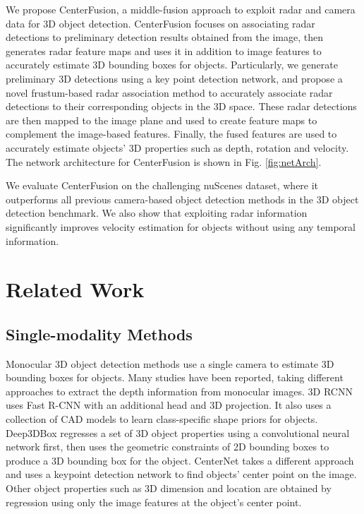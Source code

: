 \documentclass[10pt,twocolumn,letterpaper]{article}
\newcommand\method{CenterFusion}
\begin{document}
   
   We propose \method{}, a middle-fusion approach to exploit 
   radar and camera data for 3D object detection. \method{} focuses
   on associating radar detections to preliminary detection results obtained from 
   the image, then generates radar feature maps and uses it in addition to image features 
   to accurately estimate 3D bounding boxes for objects. Particularly, 
   we generate preliminary 3D detections using a key point detection network,
   and propose a novel frustum-based radar association method to accurately
   associate radar detections to their corresponding 
   objects in the 3D space. These radar detections are then mapped to the 
   image plane and used to create 
   feature maps to complement the image-based features. Finally, the fused
   features are used to accurately estimate objects' 3D properties
   such as depth, rotation and velocity. The network architecture for 
   CenterFusion is shown in Fig. \ref{fig:netArch}.
   
   We evaluate \method{} on the challenging nuScenes \cite{nuscenes2019} dataset, 
   where it outperforms all previous camera-based object detection methods in the
   3D object detection benchmark. We also show that exploiting radar information 
   significantly improves velocity estimation for objects without using any 
   temporal information.
   
   \section{Related Work}
   \subsection{Single-modality Methods}
   Monocular 3D object detection methods use a single camera to estimate 
   3D bounding boxes for objects. Many studies have been reported,  taking different approaches to extract the depth information
   from monocular images. 3D RCNN \cite{kundu3DRCNNInstanceLevel3D2018}
   uses Fast R-CNN \cite{girshickFastRCNN2015} with an additional head 
   and 3D projection. It also uses a collection of CAD models to learn class-specific
   shape priors for objects. Deep3DBox \cite{mousavian3DBoundingBox2017a} regresses a
   set of 3D object properties using a convolutional neural network first, then 
   uses the geometric constraints of 2D bounding boxes to produce a 3D 
   bounding box for the object. CenterNet \cite{zhou2019objects} takes a different approach and 
   uses a keypoint detection network to find objects' center point on the image. Other 
   object properties such as 3D dimension and location are obtained by regression
   using only the image features at the object's center point.
   
\end{document}
